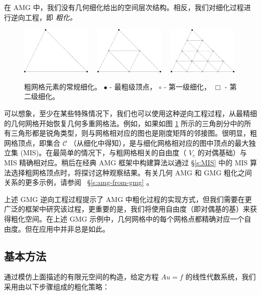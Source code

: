 \documentclass[12pt]{acta_2011xz}
\begin{document}
在 AMG 中，我们没有几何细化给出的空间层次结构。相反，我们对细化过程进行逆向工程，即  {    \it    粗化。   }   

   \begin{figure}[!htb]
\centering
\includegraphics*[width=0.3\textwidth]{ref0}
~~\includegraphics*[width=0.3\textwidth]{ref1}
~~\includegraphics*[width=0.3\textwidth]{ref2}
\caption{粗网格元素的常规细化。   $\bullet$    - 最粗级顶点，   $\circ$    - 第一级细化，   $\Box$    - 第二级细化。   \label{fig-refinement}     }
\end{figure}     

可以想象，至少在某些特殊情况下，我们也可以使用这种逆向工程过程，从最精细的几何网格开始恢复几何多重网格法。例如，如果如图    \ref{fig-refinement}    所示的三角剖分中的所有三角形都是锐角类型，则与网格相对应的图也是刚度矩阵的邻接图。很明显，粗网格顶点，即集合    $\mathcal{C}$   （从细化中得知），是与细化网格相对应的图中顶点的最大独立集 (MIS)。在最简单的情况下，与粗网格相关的自由度（   $V_c$    的对偶基础）与 MIS 精确相对应。稍后在经典 AMG 框架中构建算法以通过    \S       \ref{s:MIS}    中的 MIS 算法选择粗网格顶点时，将探讨这种观察结果。有关几何 AMG 和 GMG 粗化之间关系的更多示例，请参阅~    \S       \ref{s:amg-from-gmg}    。  

上述 GMG 逆向工程过程提示了 AMG 中粗化过程的实现方式，但我们需要在更广泛的框架中研究该过程，更重要的是，我们将使用自由度（即对偶基的基）来获得粗化空间。在上述 GMG 示例中，几何网格中的每个网格点都精确对应一个自由度。但在应用中并非总是如此。  

   \subsection{基本方法  }    通过模仿上面描述的有限元空间的构造，给定方程    $Au=f$    的线性代数系统，我们采用由以下步骤组成的粗化策略：  
\end{document}
